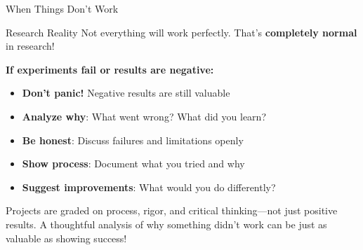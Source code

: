 \documentclass[aspectratio=169]{beamer}
\begin{document}
\begin{frame}{When Things Don't Work 🔧}
\small
\begin{block}{Research Reality}
Not everything will work perfectly. That's \textbf{completely normal} in research!
\end{block}

\vspace{0.3cm}

\textbf{If experiments fail or results are negative:}
\begin{itemize}\setlength{\itemsep}{0pt}
    \item \textbf{Don't panic!} Negative results are still valuable
    \item \textbf{Analyze why}: What went wrong? What did you learn?
    \item \textbf{Be honest}: Discuss failures and limitations openly
    \item \textbf{Show process}: Document what you tried and why
    \item \textbf{Suggest improvements}: What would you do differently?
\end{itemize}

\vspace{0.3cm}

\begin{protip}
Projects are graded on process, rigor, and critical thinking—not just positive results. A thoughtful analysis of why something didn't work can be just as valuable as showing success!
\end{protip}
\end{frame}
\end{document}
